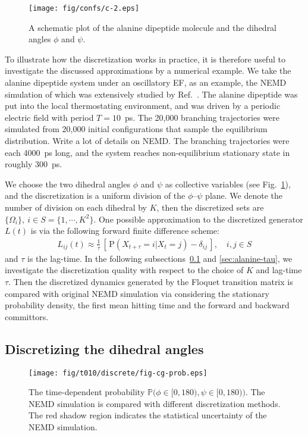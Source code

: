 \documentclass[aps, pre, preprint,unsortedaddress,a4paper,onecolumn]{revtex4}
\newcommand{\redc}[1]{{\color{red} #1}}
\newcommand{\vect}[1]{#1}
\newcommand{\prob}{\textrm{P}}
\begin{document}
\begin{figure}
  \centering
  \texttt{[image: fig/confs/c-2.eps]}
  \caption{A schematic plot of the alanine dipeptide molecule and the dihedral angles $\phi$ and $\psi$.}
  \label{fig:tmp1}
\end{figure}

To illustrate how the discretization works in practice, it is therefore
useful to investigate the discussed approximations by a numerical
example.  We take the alanine dipeptide system under an oscillatory EF,
as an example, the NEMD simulation of which was
extensively studied by Ref.~\cite{wang2014exploring}.  
The alanine dipeptide was put into the local thermostating
environment, and was driven by a periodic electric field with period
$T = 10$~ps. The 20,000 branching trajectories were simulated from 20,000
initial configurations that sample the equilibrium distribution.
\redc{Write a lot of details on NEMD.}  The branching
trajectories were each 4000~ps long, and the system reaches
non-equilibrium stationary state in roughly 300~ps.

We choose the
two dihedral angles $\phi$ and $\psi$ as collective variables (see
Fig.~\ref{fig:tmp1}), and the discretization is a uniform division of
the $\phi$--$\psi$ plane. We denote the number of division on each
dihedral by $K$, then the discretized sets are
$\{\Omega_i\},\ i\in S = \{1,\cdots,K^2\}$.
One possible approximation to
the discretized generator $L(t)$ is via
the following forward finite difference scheme:
\begin{align}
  \label{eqn:tmp4}
  L_{ij}(t) \approx \frac{1}{\tau}
  \,[\, \prob (\vect X_{t+\tau} = i \vert \vect X_{t} = j) - \delta_{ij} \,],
  \quad i,j\in S
\end{align}
and $\tau$ is the lag-time.
In the following subsections~\ref{sec:alanine-disc} and \ref{sec:alanine-tau},
we investigate the discretization
quality with respect to  the choice of $K$ and  lag-time $\tau$.
Then
the discretized dynamics generated by the Floquet transition matrix
is compared with original NEMD simulation
via considering the stationary probability density, the first mean hitting time
and the forward and backward committors.


\subsection{Discretizing the dihedral angles}
\label{sec:alanine-disc}

\begin{figure}
  \centering
  \texttt{[image: fig/t010/discrete/fig-cg-prob.eps]}  
  \caption{The time-dependent probability $\mathbb
    P\big(\phi\in[0,180), \psi\in [0,180)\big)$.  The NEMD simulation is compared with different
    discretization methods. The red shadow region indicates the
    statistical uncertainty of the NEMD simulation.}
  \label{fig:tmp2}
\end{figure}
\end{document}
